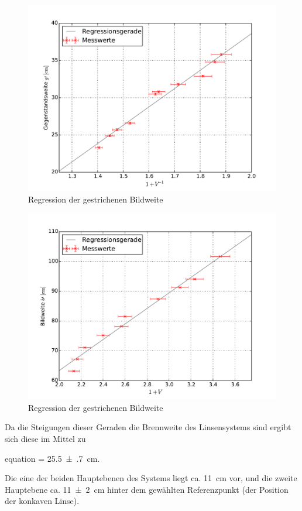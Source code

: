 	\begin{figure}[!h]
		\centering
		\includegraphics[scale=.7]{Grafiken/Messwerte_Abbe2.pdf}
		\caption{Regression der gestrichenen Bildweite\label{fig:Auswertung_AbbeG}}
	\end{figure}
	
	\begin{figure}[!h]
		\centering
		\includegraphics[scale=.7]{Grafiken/Messwerte_Abbe1.pdf}
		\caption{Regression der gestrichenen Bildweite\label{fig:Auswertung_AbbeB}}
	\end{figure}
	
	
	
	
	Da die Steigungen dieser Geraden die Brennweite des Linsensystems sind ergibt sich
	diese im Mittel zu
 	\begin{empheq}{equation}
 		\label{val:Auswertung Abbe}
 		 = \SI{25.5(7)}{\centi\meter}.
 	\end{empheq}
 	
 	Die eine der beiden Hauptebenen des Systems liegt ca. \SI{11}{\centi\meter} vor,
 	und die zweite Hauptebene ca. \SI{11(2)}{\centi\meter} hinter dem gewählten 
 	Referenzpunkt (der Position der konkaven Linse).  
 	